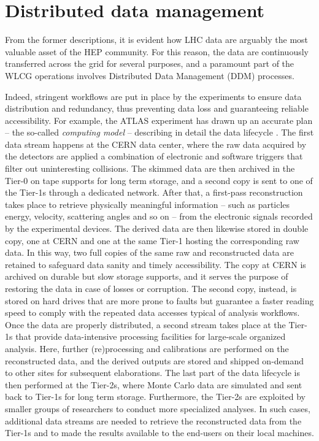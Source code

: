 \section{Distributed data management}
\label{ddm}

From the former descriptions, it is evident how LHC data are arguably the most valuable asset of the HEP community.
For this reason, the data are continuously transferred across the grid for several purposes, and a paramount part of the WLCG operations involves Distributed Data Management (DDM) processes.

Indeed, stringent workflows are put in place by the experiments to ensure data distribution and redundancy, thus preventing data loss and guaranteeing reliable accessibility.
For example, the ATLAS experiment has drawn up an accurate plan -- the so-called \textit{computing model} -- describing in detail the data lifecycle \cite{aad2008atlas, calafiura2020design_report, bird2011computing}.
The first data stream happens at the CERN data center, where the raw data acquired by the detectors are applied a combination of electronic and software triggers that filter out uninteresting collisions.
The skimmed data are then archived in the Tier-0 on tape supports for long term storage, and a second copy is sent to one of the Tier-1s through a dedicated network. 
After that, a first-pass reconstruction takes place to retrieve physically meaningful information -- such as particles energy, velocity, scattering angles and so on  -- from the electronic signals recorded by the experimental devices.
The derived data are then likewise stored in double copy, one at CERN and one at the same Tier-1 hosting the corresponding raw data.
In this way, two full copies of the same raw and reconstructed data are retained to safeguard data sanity and timely accessibility.
The copy at CERN is archived on durable but slow storage supports, and it serves the purpose of restoring the data in case of losses or corruption. The second copy, instead, is stored on hard drives that are more prone to faults but guarantee a faster reading speed to comply with the repeated data accesses typical of analysis workflows.
Once the data are properly distributed, a second stream takes place at the Tier-1s that provide data-intensive processing facilities for large-scale organized analysis. Here, further (re)processing and calibrations are performed on the reconstructed data, and the derived outputs are stored and shipped on-demand to other sites for subsequent elaborations.
The last part of the data lifecycle is then performed at the Tier-2s, where Monte Carlo data are simulated and sent back to Tier-1s for long term storage. 
Furthermore, the Tier-2s are exploited by smaller groups of researchers to conduct more specialized analyses. In such cases, additional data streams are needed to retrieve the reconstructed data from the Tier-1s and to made the results available to the end-users on their local machines.

